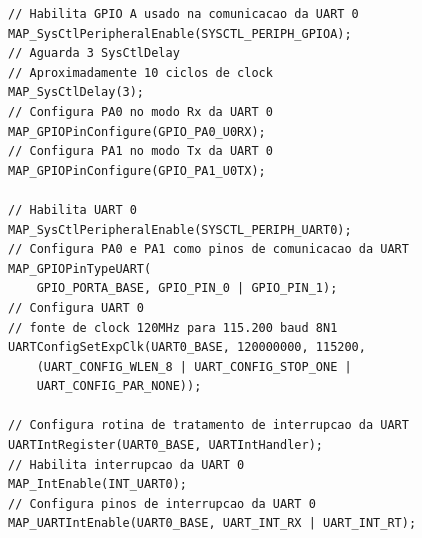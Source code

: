 \begin{lstlisting}[style=citacao]
	// Habilita GPIO A usado na comunicacao da UART 0
MAP_SysCtlPeripheralEnable(SYSCTL_PERIPH_GPIOA);
// Aguarda 3 SysCtlDelay
// Aproximadamente 10 ciclos de clock
MAP_SysCtlDelay(3);
// Configura PA0 no modo Rx da UART 0
MAP_GPIOPinConfigure(GPIO_PA0_U0RX);
// Configura PA1 no modo Tx da UART 0
MAP_GPIOPinConfigure(GPIO_PA1_U0TX);

// Habilita UART 0
MAP_SysCtlPeripheralEnable(SYSCTL_PERIPH_UART0);
// Configura PA0 e PA1 como pinos de comunicacao da UART
MAP_GPIOPinTypeUART(
	GPIO_PORTA_BASE, GPIO_PIN_0 | GPIO_PIN_1);
// Configura UART 0
// fonte de clock 120MHz para 115.200 baud 8N1
UARTConfigSetExpClk(UART0_BASE, 120000000, 115200,
	(UART_CONFIG_WLEN_8 | UART_CONFIG_STOP_ONE | 
	UART_CONFIG_PAR_NONE));

// Configura rotina de tratamento de interrupcao da UART
UARTIntRegister(UART0_BASE, UARTIntHandler);
// Habilita interrupcao da UART 0
MAP_IntEnable(INT_UART0);
// Configura pinos de interrupcao da UART 0
MAP_UARTIntEnable(UART0_BASE, UART_INT_RX | UART_INT_RT);
\end{lstlisting}


